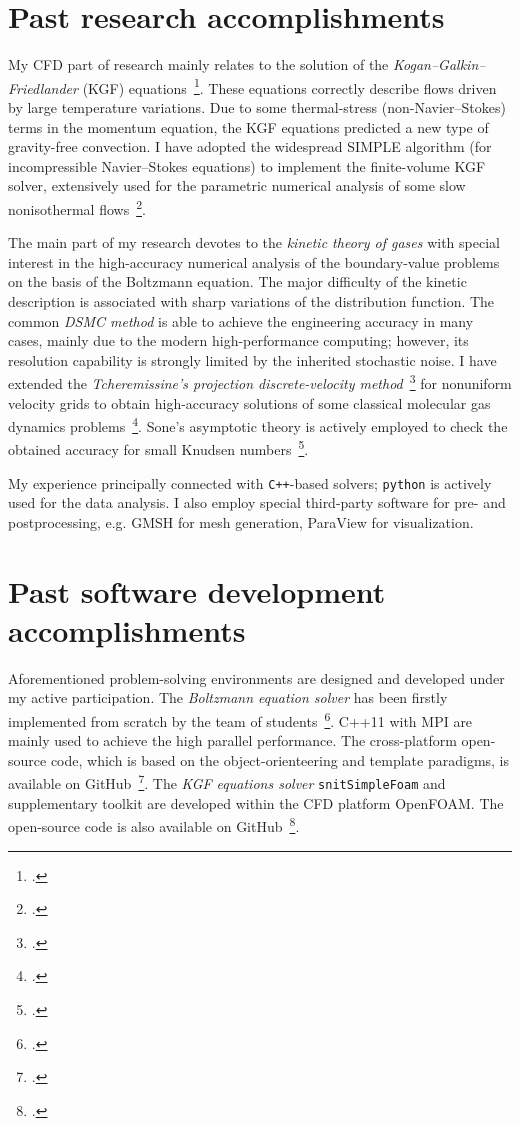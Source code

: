 \documentclass[11pt]{article}
\renewcommand\cite\footcite
\begin{document}
\section{Past research accomplishments}

My CFD part of research mainly relates to the solution of the \emph{Kogan--Galkin--Friedlander} (KGF) equations~\cite{Kogan1976}.
These equations correctly describe flows driven by large temperature variations.
Due to some thermal-stress (non-Navier--Stokes) terms in the momentum equation,
the KGF equations predicted a new type of gravity-free convection.
I have adopted the widespread SIMPLE algorithm (for incompressible Navier--Stokes equations)
to implement the finite-volume KGF solver,
extensively used for the parametric numerical analysis of some slow nonisothermal flows~\cite{Rogozin2014}.

The main part of my research devotes to the \emph{kinetic theory of gases} with special interest
in the high-accuracy numerical analysis of the boundary-value problems on the basis of the Boltzmann equation.
The major difficulty of the kinetic description is associated with sharp variations of the distribution function.
The common \emph{DSMC method} is able to achieve the engineering accuracy in many cases,
mainly due to the modern high-performance computing; however, its resolution capability is strongly
limited by the inherited stochastic noise.
I have extended the \emph{Tcheremissine's projection discrete-velocity method}~\cite{Tcheremissine1998, Tcheremissine2006}
for nonuniform velocity grids to obtain high-accuracy solutions of
some classical molecular gas dynamics problems~\cite{Rogozin2016, Rogozin2017}.
Sone's asymptotic theory is actively employed to check the obtained accuracy for small Knudsen numbers~\cite{Sone2007}.

My experience principally connected with \verb_C++_-based solvers;
\verb+python+ is actively used for the data analysis.
I also employ special third-party software for pre- and postprocessing,
e.g. GMSH for mesh generation, ParaView for visualization.

\section{Past software development accomplishments}

Aforementioned problem-solving environments are designed and developed under my active participation.
The \emph{Boltzmann equation solver} has been firstly implemented from scratch by the team of students~\cite{Rogozin2010}.
C++11 with MPI are mainly used to achieve the high parallel performance.
The cross-platform open-source code, which is based on the object-orienteering and template paradigms,
is available on GitHub~\cite{github-kesolver}.
The \emph{KGF equations solver} \verb+snitSimpleFoam+ and supplementary toolkit
are developed within the CFD platform OpenFOAM.
The open-source code is also available on GitHub~\cite{github-openfoam}.
\end{document}
